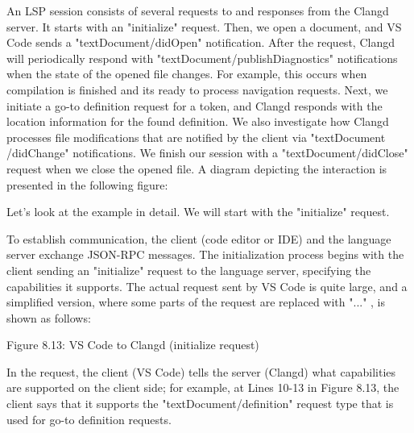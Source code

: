 An LSP session consists of several requests to and responses from the Clangd server. It starts with an "initialize" request. Then, we open a document, and VS Code sends a "textDocument/didOpen" notification. After the request, Clangd will periodically respond with "textDocument/publishDiagnostics" notifications when the state of the opened file changes. For example, this occurs when compilation is finished and its ready to process navigation requests. Next, we initiate a go-to definition request for a token, and Clangd responds with the location information for the found definition. We also investigate how Clangd processes file modifications that are notified by the client via "textDocument /didChange" notifications. We finish our session with a "textDocument/didClose" request when we close the opened file. A diagram depicting the interaction is presented in the following figure:


Let’s look at the example in detail. We will start with the "initialize" request.


To establish communication, the client (code editor or IDE) and the language server exchange JSON-RPC messages. The initialization process begins with the client sending an "initialize" request to the language server, specifying the capabilities it supports. The actual request sent by VS Code is quite large, and a simplified version, where some parts of the request are replaced with "..." , is shown as follows:

\begin{shell}
{
 "id": 0,
 "jsonrpc": "2.0",
 "method": "initialize",
 "params": {
   "capabilities": {
     ...
     "textDocument": {
       ...
       "definition": {
         "dynamicRegistration": true,
         "linkSupport": true
       },
       ...
     },
     "clientInfo": {
       "name": "Visual Studio Code",
       "version": "1.85.1"
     },
     ...
   }
 }
\end{shell}


\begin{center}
Figure 8.13: VS Code to Clangd (initialize request)
\end{center}

In the request, the client (VS Code) tells the server (Clangd) what capabilities are supported on the client side; for example, at Lines 10-13 in Figure 8.13, the client says that it supports the "textDocument/definition" request type that is used for go-to definition requests.

